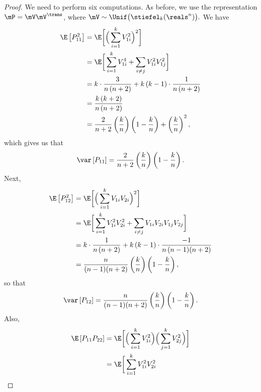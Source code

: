 \begin{proof}
    We need to perform six computations.  As before, we use the representation
    $\mP = \mV \mV^\trans$, where 
    \(
        \mV \sim \Unif\big( \stiefel_k(\reals^n) \big).
    \)
    We have
    \begin{align*}
        \E \left[ P_{11}^2 \right]
        &= \E \bigg[ \Big( 
                         \sum_{i=1}^k V_{1i}^2
                     \Big)^2
              \bigg] \\
        &= \E \bigg[
                  \sum_{i=1}^k V_{1i}^4
                  + \sum_{i\neq j} V_{1i}^2 V_{1j}^2
              \bigg] \\
        &= k \cdot \frac{3}{ n \, (n+2) } 
           + k \, (k-1) \cdot \frac{1}{ n \, (n+2) } \\
        &= \frac{ k \, (k+2) }{ n \,(n+2) } \\
        &= \frac{2}{ n+2}
           \left(\frac{k}{n}\right) \left( 1 - \frac{k}{n} \right)
           + \left( \frac{k}{n} \right)^2,
    \end{align*}
    which gives us that 
    \[
        \var \left[ P_{11} \right]
        = \frac{2}{ n+2 }
           \left(\frac{k}{n}\right) \left( 1 - \frac{k}{n} \right).
    \]
    Next,
    \begin{align*}
        \E \left[ P_{12}^2 \right]
        &= \E \bigg[ \Big( 
                         \sum_{i=1}^k V_{1i} V_{2i}
                     \Big)^2
              \bigg] \\
        &= \E \bigg[ 
                  \sum_{i=1}^k V_{1i}^2 V_{2i}^2
                  + \sum_{i\neq j} 
                        V_{1i} V_{2i} V_{1j} V_{2j}
              \bigg] \\
        &= k \cdot \frac{ 1 }{ n \, (n+2) }
           + k \, (k-1) \cdot \frac{-1}{ n \, (n-1) (n+2) } \\
        &= \frac{n}{ (n-1) (n+2) } 
           \left(\frac{k}{n}\right) \left( 1 - \frac{k}{n} \right),
    \end{align*}
    so that
    \[
        \var \left[ P_{12} \right]
        = \frac{n}{ (n-1) (n+2) } 
           \left(\frac{k}{n}\right) \left( 1 - \frac{k}{n} \right).
    \]
    Also,
    \begin{align*}
        \E \left[ P_{11} P_{22} \right]
        &= \E \bigg[
                \Big( \sum_{i=1}^k V_{1i}^2 \Big)
                \Big( \sum_{j=1}^k V_{2j}^2 \Big)
              \bigg] \\
        &= \E \bigg[
                  \sum_{i=1}^k V_{1i}^2 V_{2i}^2

\end{align*}
\end{proof}
